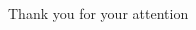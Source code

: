 \STANDARD{}
{
  \begin{columns}
    \begin{column}{0.35\textwidth}
      \begin{block}{~~~~~~~Thank you}
        \centering
        for your attention
      \end{block}
    \end{column}
  \end{columns}
}



